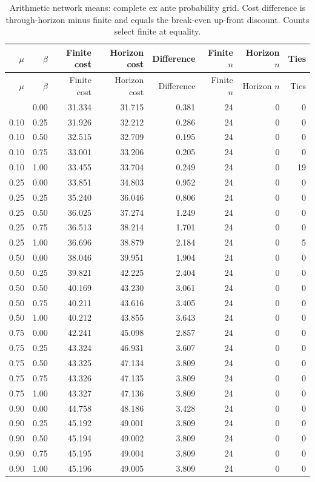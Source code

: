 \documentclass[preprint,11pt,authoryear]{elsarticle}
\begin{document}
\begingroup\small\setlength{\tabcolsep}{4pt}\begin{longtable}{rrrrrrrr}
\caption{Arithmetic network means: complete ex ante probability grid. Cost difference is through-horizon minus finite and equals the break-even up-front discount. Counts select finite at equality.}\\
\toprule $\mu$ & $\beta$ & Finite cost & Horizon cost & Difference & Finite $n$ & Horizon $n$ & Ties\\\midrule
\endfirsthead
\toprule $\mu$ & $\beta$ & Finite cost & Horizon cost & Difference & Finite $n$ & Horizon $n$ & Ties\\\midrule
\endhead\bottomrule\endfoot
0.10 & 0.00 & 31.334 & 31.715 & 0.381 & 24 & 0 & 0\\
0.10 & 0.25 & 31.926 & 32.212 & 0.286 & 24 & 0 & 0\\
0.10 & 0.50 & 32.515 & 32.709 & 0.195 & 24 & 0 & 0\\
0.10 & 0.75 & 33.001 & 33.206 & 0.205 & 24 & 0 & 0\\
0.10 & 1.00 & 33.455 & 33.704 & 0.249 & 24 & 0 & 19\\
0.25 & 0.00 & 33.851 & 34.803 & 0.952 & 24 & 0 & 0\\
0.25 & 0.25 & 35.240 & 36.046 & 0.806 & 24 & 0 & 0\\
0.25 & 0.50 & 36.025 & 37.274 & 1.249 & 24 & 0 & 0\\
0.25 & 0.75 & 36.513 & 38.214 & 1.701 & 24 & 0 & 0\\
0.25 & 1.00 & 36.696 & 38.879 & 2.184 & 24 & 0 & 5\\
0.50 & 0.00 & 38.046 & 39.951 & 1.904 & 24 & 0 & 0\\
0.50 & 0.25 & 39.821 & 42.225 & 2.404 & 24 & 0 & 0\\
0.50 & 0.50 & 40.169 & 43.230 & 3.061 & 24 & 0 & 0\\
0.50 & 0.75 & 40.211 & 43.616 & 3.405 & 24 & 0 & 0\\
0.50 & 1.00 & 40.212 & 43.855 & 3.643 & 24 & 0 & 0\\
0.75 & 0.00 & 42.241 & 45.098 & 2.857 & 24 & 0 & 0\\
0.75 & 0.25 & 43.324 & 46.931 & 3.607 & 24 & 0 & 0\\
0.75 & 0.50 & 43.325 & 47.134 & 3.809 & 24 & 0 & 0\\
0.75 & 0.75 & 43.326 & 47.135 & 3.809 & 24 & 0 & 0\\
0.75 & 1.00 & 43.327 & 47.136 & 3.809 & 24 & 0 & 0\\
0.90 & 0.00 & 44.758 & 48.186 & 3.428 & 24 & 0 & 0\\
0.90 & 0.25 & 45.192 & 49.001 & 3.809 & 24 & 0 & 0\\
0.90 & 0.50 & 45.194 & 49.002 & 3.809 & 24 & 0 & 0\\
0.90 & 0.75 & 45.195 & 49.004 & 3.809 & 24 & 0 & 0\\
0.90 & 1.00 & 45.196 & 49.005 & 3.809 & 24 & 0 & 0\\
\end{longtable}\endgroup
\end{document}
